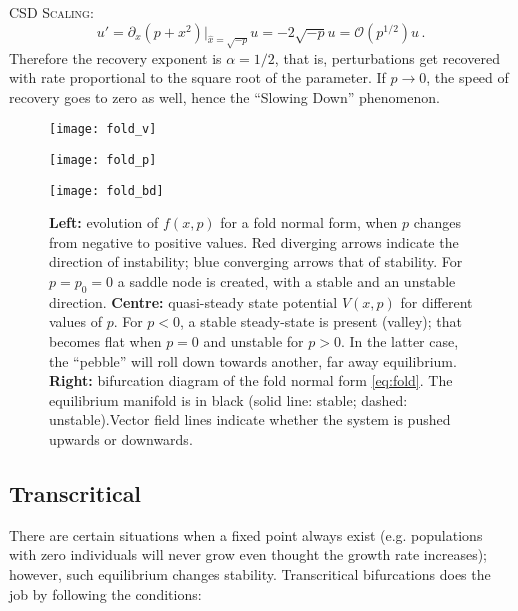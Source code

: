 \textsc{CSD Scaling}:
\begin{equation}
	u' = \partial_x(p+x^2)|_{\hat{x} = \sqrt{-p}}u = -2\sqrt{-p}u = \mathcal{O}(p^{1/2}) u \, .
\end{equation}
Therefore the recovery exponent is $\alpha = 1/2$, that is, perturbations get recovered with rate proportional to the square root of the parameter. If $p \rightarrow 0$, the speed of recovery goes to zero as well, hence the ``Slowing Down'' phenomenon.

\begin{figure}[h]
	\centering
	\begin{minipage}[c]{0.32\textwidth}
		\texttt{[image: fold\_v]}
		\renewcommand{\figurename}{Fig.}
	\end{minipage}
	\hspace{0.01cm}
	\begin{minipage}[c]{0.32\textwidth}
		\texttt{[image: fold\_p]}
		\renewcommand{\figurename}{Fig.}
	\end{minipage} 
	\hspace{0.01cm}
	\begin{minipage}[c]{0.32\textwidth}
		\texttt{[image: fold\_bd]}
		\renewcommand{\figurename}{Fig.}
	\end{minipage}
	
	\caption{\small \textbf{Left:} evolution of $f(x,p)$ for a fold normal form, when $p$ changes from negative to positive values. Red diverging arrows indicate the direction of instability; blue converging arrows that of stability. For $p = p_0 = 0$ a saddle node is created, with a stable and an unstable direction. \textbf{Centre:} quasi-steady state potential $V(x,p)$ for different values of $p$. For $p<0$, a stable steady-state is present (valley); that becomes flat when $p=0$ and unstable for $p>0$. In the latter case, the ``pebble'' will roll down towards another, far away equilibrium. \textbf{Right:} bifurcation diagram of the fold normal form \ref{eq:fold}. The equilibrium manifold is in black (solid line: stable; dashed: unstable).Vector field lines indicate whether the system is pushed upwards or downwards. }
	\label{fig:fold_diag}
\end{figure}


\tocless\subsection{Transcritical}
There are certain situations when a fixed point always exist (e.g. populations with zero individuals will never grow even thought the growth rate increases); however, such equilibrium changes stability. Transcritical bifurcations does the job by following the conditions:

